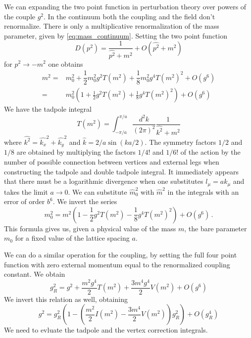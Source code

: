 \documentclass[12pt,a4paper]{report}
\begin{document}
  We can expanding the two point function in perturbation theory over powers of the couple $g^2$. In the continuum both the coupling and the field don't renormalize. There is only a multiplicative renormalization of the mass parameter, given by \eqref{eq:mass_continuum}. Setting the two point function \begin{equation}
  D(p^2) = \dfrac{1}{\hat{p^2}+ m^2} +O(\hat{p^2} +m^2)
\end{equation}  for $p^2 \to -m^2$ one obtains \begin{align}
  m^2=&   m_0^2  +\dfrac{1}{2}   m_0^2 g^2 T( m^2)+ \dfrac{1}{8}  m_0^2 g^4 T( m^2)^2 + O(g^6) \\
 = &  m_0^2 (1 + \frac{1}{2}g^2 T( m^2) + \frac{1}{8} g^4 T( m^2)^2 ) + O(g^6 )
 \end{align} We have  the tadpole integral \begin{equation}
 \label{eq:tadpole}
 T(m^2) = \int_{-\pi/a}^{\pi/a} \dfrac{d^2k}{(2 \pi)^2} \dfrac{1}{\hat{k^2} + m^2
  }
 \end{equation} where $\hat{k^2} = \hat{k_x}^2 + \hat{k_y}^2$ and $\hat k = 2/a \sin (ka/2)$. The symmetry factors $1/2$ and $1/8$ are obtained by multiplying the factors $1/4!$ and $1/6!$ of the action by the number of possible connection between vertices and external legs when constructing the tadpole and double tadpole integral.
 It immediately appears that there must be a logarithmic divergence when one substitutes $l_\mu = a k_\mu$ and takes the limit $a\to 0$. 
 We can substitute $\hat m_0^2$ with $\hat m^2$ in the integrals with an error of order $b^6$. We invert the series \begin{equation}
  m_0^2 =  m^2(1 - \frac{1}{2}g^2 T(  m^2) - \frac{1}{8} g^4 T(m^2)^2 ) + O( g^6 ) \,.
 \end{equation} This formula gives us, given a physical value of the mass $m$, the bare parameter $m_0$ for a fixed value of the lattice spacing $a$. 
 
 We can do a similar operation for the coupling, by setting the full four point function with zero external momentum equal to the renormalized coupling constant. We obtain \begin{equation}
 g_R^2 = g^2 +\dfrac{m^2 g^4}{2} T(m^2) + \dfrac{3 m^4 g^4}{2} V(m^2) + O(g^6)
\end{equation} We invert this relation as well, obtaining \begin{equation}
g^2 = g_R^2(1- (\dfrac{m^2}{2}I(m^2) - \dfrac{3m^4}{2}V(m^2) )g_R^2) + O(g_R^4)
\end{equation} We need to evluate the tadpole and the vertex correction integrals.
  
\end{document}
